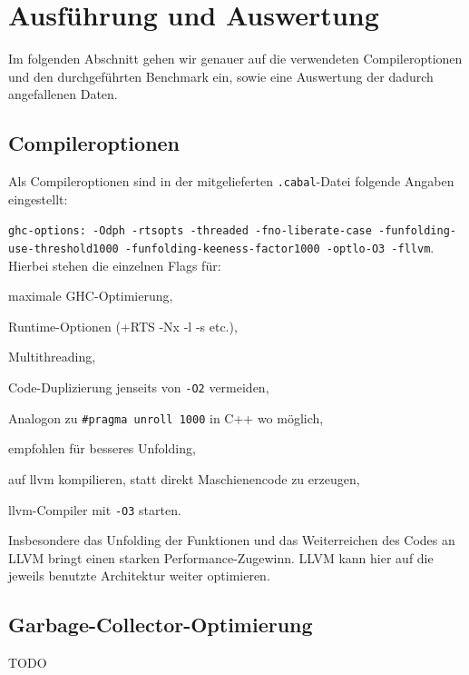 \documentclass[a4paper]{scrartcl}
\begin{document}
\section{Ausführung und Auswertung}
Im folgenden Abschnitt gehen wir genauer auf die verwendeten Compileroptionen und den durchgeführten Benchmark ein, sowie eine Auswertung der dadurch angefallenen Daten.
\subsection{Compileroptionen}
Als Compileroptionen sind in der mitgelieferten \texttt{.cabal}-Datei folgende Angaben eingestellt:\par
\texttt{ghc-options: -Odph -rtsopts -threaded -fno-liberate-case -funfolding-use-threshold1000 -funfolding-keeness-factor1000 -optlo-O3 -fllvm}.
Hierbei stehen die einzelnen Flags für:
\begin{description}[style=multiline,leftmargin=6.5cm,font=\ttfamily\bfseries]
 \item[-Odph] maximale GHC-Optimierung,
 \item[-rtsopts] Runtime-Optionen (+RTS -Nx -l -s etc.),
 \item[-threaded] Multithreading,
 \item[-fno-liberate-case] Code-Duplizierung jenseits von \texttt{-O2} vermeiden,
 \item[-funfolding-use-threshold1000] Analogon zu \texttt{\#pragma unroll 1000} in C++ wo möglich,
 \item[-funfolding-keeness-factor1000] empfohlen für besseres Unfolding,
 \item[-fllvm] auf llvm kompilieren, statt direkt Maschienencode zu erzeugen,
 \item[-optlo-O3] llvm-Compiler mit \texttt{-O3} starten.
\end{description}
Insbesondere das Unfolding der Funktionen und das Weiterreichen des Codes an LLVM bringt einen starken Performance-Zugewinn. LLVM kann hier auf die jeweils benutzte Architektur weiter optimieren.

\subsection{Garbage-Collector-Optimierung}
TODO
\end{document}
